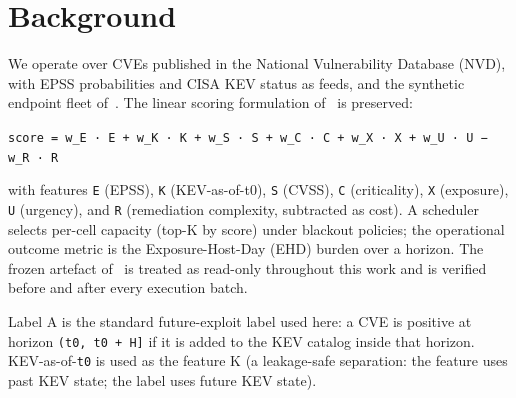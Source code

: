 \section{Background}
We operate over CVEs published in the National Vulnerability Database (NVD), with EPSS probabilities and CISA KEV status as feeds, and the synthetic endpoint fleet of~\cite{Malla2026VulnPrio}. The linear scoring formulation of~\cite{Malla2026VulnPrio} is preserved:

\texttt{score = w\_E · E + w\_K · K + w\_S · S + w\_C · C + w\_X · X + w\_U · U − w\_R · R}

with features \texttt{E} (EPSS), \texttt{K} (KEV-as-of-t0), \texttt{S} (CVSS), \texttt{C} (criticality), \texttt{X} (exposure), \texttt{U} (urgency), and \texttt{R} (remediation complexity, subtracted as cost). A scheduler selects per-cell capacity (top-K by score) under blackout policies; the operational outcome metric is the Exposure-Host-Day (EHD) burden over a horizon. The frozen artefact of~\cite{Malla2026VulnPrio} is treated as read-only throughout this work and is verified before and after every execution batch.

Label A is the standard future-exploit label used here: a CVE is positive at horizon \texttt{(t0, t0 + H]} if it is added to the KEV catalog inside that horizon. KEV-as-of-\texttt{t0} is used as the feature K (a leakage-safe separation: the feature uses past KEV state; the label uses future KEV state).
